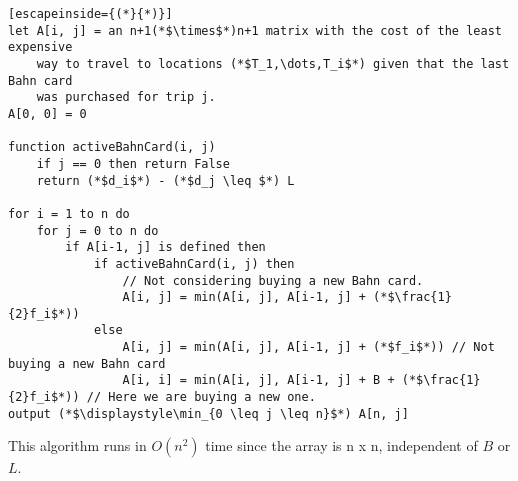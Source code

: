\documentclass{article}
\begin{document}
    \begin{lstlisting}[escapeinside={(*}{*)}]
let A[i, j] = an n+1(*$\times$*)n+1 matrix with the cost of the least expensive
    way to travel to locations (*$T_1,\dots,T_i$*) given that the last Bahn card
    was purchased for trip j.
A[0, 0] = 0

function activeBahnCard(i, j)
    if j == 0 then return False
    return (*$d_i$*) - (*$d_j \leq $*) L

for i = 1 to n do
    for j = 0 to n do
        if A[i-1, j] is defined then
            if activeBahnCard(i, j) then
                // Not considering buying a new Bahn card.
                A[i, j] = min(A[i, j], A[i-1, j] + (*$\frac{1}{2}f_i$*))
            else
                A[i, j] = min(A[i, j], A[i-1, j] + (*$f_i$*)) // Not buying a new Bahn card
                A[i, i] = min(A[i, j], A[i-1, j] + B + (*$\frac{1}{2}f_i$*)) // Here we are buying a new one.
output (*$\displaystyle\min_{0 \leq j \leq n}$*) A[n, j]
    \end{lstlisting}

This algorithm runs in $O(n^2)$ time since the array is n x n, independent of $B$ or $L$.
\end{document}
